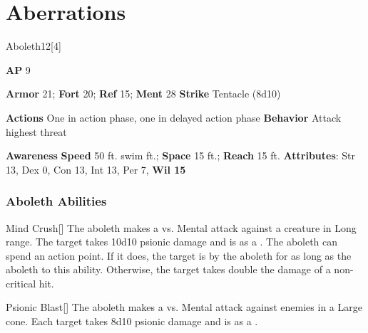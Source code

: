 
\section{Aberrations}
\begin{monsection}{Aboleth}{12}[4]
\vspace{-1em}\vspace{-1em}
\begin{spellcontent}
\begin{spelltargetinginfo}
{\textbf{AP} 9}

\pari \textbf{Armor} 21;
\textbf{Fort} 20;
\textbf{Ref} 15;
\textbf{Ment} 28
\pari \textbf{Strike} Tentacle  (8d10)


\pari \textbf{Actions} One in action phase, one in delayed action phase
\pari \textbf{Behavior} Attack highest threat
\end{spelltargetinginfo}
\end{spellcontent}

\begin{monsterfooter}
\pari \textbf{Awareness} 
\pari \textbf{Speed} 50 ft. swim ft.;
\textbf{Space} 15 ft.;
\textbf{Reach} 15 ft.
\pari \textbf{Attributes}:
Str 13,
Dex 0,
Con 13,
Int 13,
Per 7,
\textbf{Wil 15}
\end{monsterfooter}
\end{monsection}


\subsubsection{Aboleth Abilities}

\begin{freeability}{Mind Crush}[]
The aboleth makes a  vs. Mental attack against a creature in Long range.
\hit The target takes 10d10 psionic damage and is  as a .
\crit The aboleth can spend an action point.
If it does, the target is  by the aboleth for as long as the aboleth  to this ability.
Otherwise, the target takes double the damage of a non-critical hit.
\end{freeability}

\vspace{0.5em}
\begin{freeability}{Psionic Blast}[]
The aboleth makes a  vs. Mental attack against enemies in a Large cone.
\hit Each target takes 8d10 psionic damage and is  as a .
\end{freeability}

